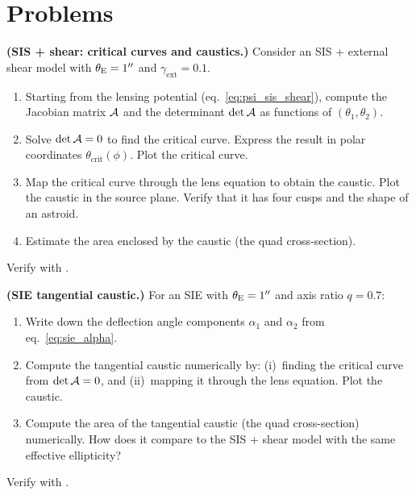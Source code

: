 \section{Problems}
\label{sec:elliptical_problems}

\begin{exercise}
\label{ex:sis_shear_crit}
\textbf{(SIS + shear: critical curves and caustics.)}
Consider an SIS + external shear model with $\theta_{\mathrm{E}} = 1''$ and
$\gamma_{\mathrm{ext}} = 0.1$.
\begin{enumerate}[label=(\alph*)]
    \item Starting from the lensing potential
          (eq.~\ref{eq:psi_sis_shear}), compute the Jacobian matrix
          $\mathcal{A}$ and the determinant $\det\mathcal{A}$ as functions of
          $(\theta_1, \theta_2)$.
    \item Solve $\det\mathcal{A} = 0$ to find the critical curve.  Express
          the result in polar coordinates $\theta_{\mathrm{crit}}(\phi)$.
          Plot the critical curve.
    \item Map the critical curve through the lens equation to obtain
          the caustic.  Plot the caustic in the source plane.  Verify
          that it has four cusps and the shape of an astroid.
    \item Estimate the area enclosed by the caustic (the quad
          cross-section).
\end{enumerate}
Verify with
.
\end{exercise}

\begin{exercise}
\label{ex:sie_caustic}
\textbf{(SIE tangential caustic.)}
For an SIE with $\theta_{\mathrm{E}} = 1''$ and axis ratio $q = 0.7$:
\begin{enumerate}[label=(\alph*)]
    \item Write down the deflection angle components $\alpha_1$ and
          $\alpha_2$ from eq.~\eqref{eq:sie_alpha}.
    \item Compute the tangential caustic numerically by: (i)~finding
          the critical curve from $\det\mathcal{A} = 0$, and (ii)~mapping
          it through the lens equation.  Plot the caustic.
    \item Compute the area of the tangential caustic (the quad
          cross-section) numerically.  How does it compare to the
          SIS + shear model with the same effective ellipticity?
\end{enumerate}
Verify with
.
\end{exercise}

